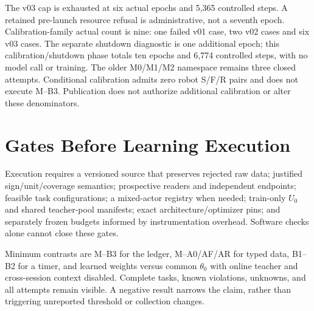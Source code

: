 \documentclass{article}
\begin{document}
The v03 cap is exhausted at six actual epochs and 5,365 controlled steps. A retained pre-launch resource refusal is administrative, not a seventh epoch. Calibration-family actual count is nine: one failed v01 case, two v02 cases and six v03 cases. The separate shutdown diagnostic is one additional epoch; this calibration/shutdown phase totals ten epochs and 6,774 controlled steps, with no model call or training. The older M0/M1/M2 namespace remains three closed attempts. Conditional calibration admits zero robot S/F/R pairs and does not execute M--B3. Publication does not authorize additional calibration or alter these denominators.

\section{Gates Before Learning Execution}
Execution requires a versioned source that preserves rejected raw data; justified sign/unit/coverage semantics; prospective readers and independent endpoints; feasible task configurations; a mixed-actor registry when needed; train-only $U_0$ and shared teacher-pool manifests; exact architecture/optimizer pins; and separately frozen budgets informed by instrumentation overhead. Software checks alone cannot close these gates.

Minimum contrasts are M--B3 for the ledger, M--A0/AF/AR for typed data, B1--B2 for a timer, and learned weights versus common $\theta_0$ with online teacher and cross-session context disabled. Complete tasks, known violations, unknowns, and all attempts remain visible. A negative result narrows the claim, rather than triggering unreported threshold or collection changes.
\end{document}
